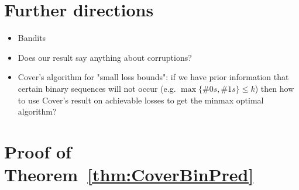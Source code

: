 \documentclass[11pt,letter]{article}
\begin{document}
\section{Further directions}

\begin{itemize}
    \item Bandits
    \item Does our result say anything about corruptions? 
    \item Cover's algorithm for "small loss bounds": if we have prior information that certain binary sequences will not occur (e.g. $\max\{\# 0s, \# 1s\} \le k$) then how to use Cover's result on achievable losses to get the minmax optimal algorithm? 
\end{itemize}

\appendix

\section{Proof of Theorem~\ref{thm:CoverBinPred}} \label{appendix:CoverThmPf}


 
\end{document}
